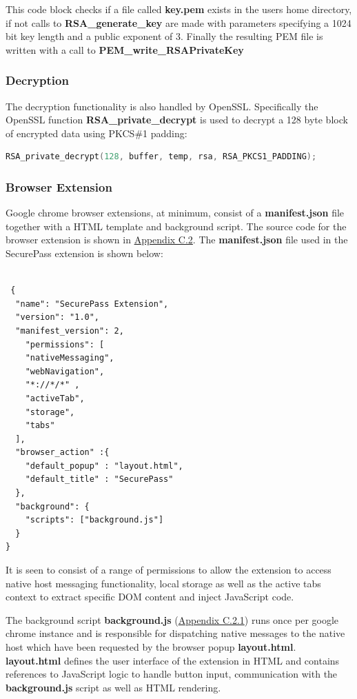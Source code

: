 This code block checks if a file called \textbf{key.pem} exists in the users home directory, if not calls to \textbf{RSA\_generate\_key} are made with parameters specifying a 1024 bit key length and a public exponent of 3. Finally the resulting PEM file is written with a call to \textbf{PEM\_write\_RSAPrivateKey}
\subsubsection{Decryption}
The decryption functionality is also handled by OpenSSL. Specifically the OpenSSL function \textbf{RSA\_private\_decrypt} is used to decrypt a 128 byte block of encrypted data using PKCS\#1 padding:
\begin{lstlisting}[language=C]
RSA_private_decrypt(128, buffer, temp, rsa, RSA_PKCS1_PADDING);
\end{lstlisting}

\subsubsection{Browser Extension}

Google chrome browser extensions, at minimum, consist of a \textbf{manifest.json} file together with a HTML template and background script. The source code for the browser extension is shown in \hyperref[sec:browser11]{Appendix C.2}. The \textbf{manifest.json} file used in the SecurePass extension is shown below:
\begin{lstlisting}[]

 {
  "name": "SecurePass Extension",
  "version": "1.0",
  "manifest_version": 2,
    "permissions": [
    "nativeMessaging",
    "webNavigation", 
    "*://*/*" ,
    "activeTab",
    "storage",
    "tabs"
  ],
  "browser_action" :{
    "default_popup" : "layout.html",
    "default_title" : "SecurePass"
  },
  "background": {
    "scripts": ["background.js"]
  }
}
\end{lstlisting}

It is seen to consist of a range of permissions to allow the extension to access native host messaging functionality, local storage as well as the active tabs context to extract specific DOM content and inject JavaScript code.

The background script \textbf{background.js} (\hyperref[sec:back]{Appendix C.2.1}) runs once per google chrome instance and is responsible for dispatching native messages to the native host which have been requested by the browser popup \textbf{layout.html}. \textbf{layout.html} defines the user interface of the extension in HTML and contains references to JavaScript logic to handle button input, communication with the \textbf{background.js} script as well as HTML rendering.

